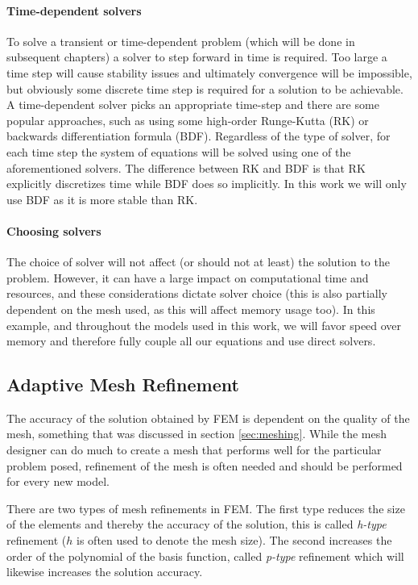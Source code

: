 \paragraph{Time-dependent solvers}

To solve a transient or time-dependent problem (which will be done in subsequent chapters) a solver to step forward in time is required.
Too large a time step will cause stability issues and ultimately convergence will be impossible, but obviously some discrete time step is required for a solution to be achievable.
A time-dependent solver picks an appropriate time-step and there are some popular approaches, such as using some high-order Runge-Kutta (RK) or backwards differentiation formula (BDF).
Regardless of the type of solver, for each time step the system of equations will be solved using one of the aforementioned solvers.
The difference between RK and BDF is that RK explicitly discretizes time while BDF does so implicitly.
In this work we will only use BDF as it is more stable than RK.\par

\paragraph{Choosing solvers}

The choice of solver will not affect (or should not at least) the solution to the problem.
However, it can have a large impact on computational time and resources, and these considerations dictate solver choice (this is also partially dependent on the mesh used, as this will affect memory usage too).
In this example, and throughout the models used in this work, we will favor speed over memory and therefore fully couple all our equations and use direct solvers.\par

\subsection{Adaptive Mesh Refinement}

The accuracy of the solution obtained by FEM is dependent on the quality of the mesh, something that was discussed in section \ref{sec:meshing}.
While the mesh designer can do much to create a mesh that performs well for the particular problem posed, refinement of the mesh is often needed and should be performed for every new model.\par

There are two types of mesh refinements in FEM.
The first type reduces the size of the elements and thereby the accuracy of the solution, this is called \textit{h-type} refinement ($h$ is often used to denote the mesh size).
The second increases the order of the polynomial of the basis function, called \textit{p-type} refinement which will likewise increases the solution accuracy.\par

